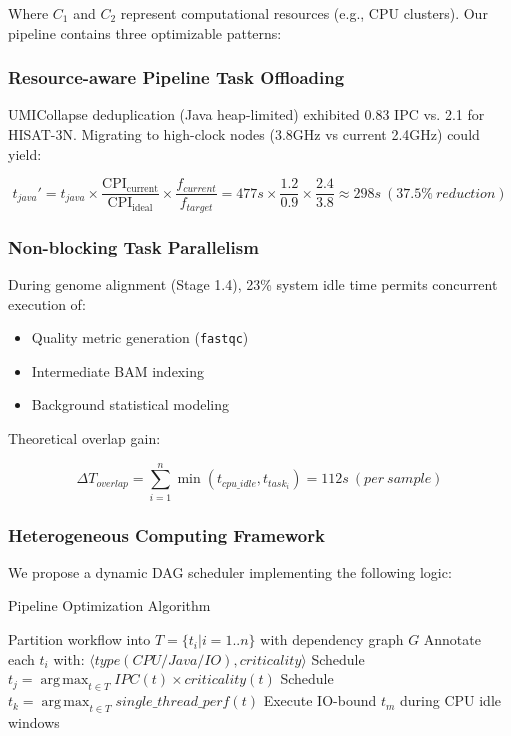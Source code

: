 \documentclass[a4paper,12pt]{article}
\DeclareMathOperator*{\argmax}{arg\,max}  %
\begin{document}
Where \(C_1\) and \(C_2\) represent computational resources (e.g., CPU clusters). Our pipeline contains three optimizable patterns:

\subsubsection{Resource-aware Pipeline Task Offloading}
UMICollapse deduplication (Java heap-limited) exhibited 0.83 IPC vs. 2.1 for HISAT-3N. Migrating to high-clock nodes (3.8GHz vs current 2.4GHz) could yield:

\begin{equation}
t_{java}' = t_{java} \times \frac{\mathrm{CPI_{current}}}{\mathrm{CPI_{ideal}}} \times \frac{f_{current}}{f_{target}} = 477s \times \frac{1.2}{0.9} \times \frac{2.4}{3.8} \approx 298s\ (37.5\%\ reduction)
\end{equation}

\subsubsection{Non-blocking Task Parallelism}
During genome alignment (Stage 1.4), 23\% system idle time permits concurrent execution of:
\begin{itemize}
    \item Quality metric generation (\texttt{fastqc})
    \item Intermediate BAM indexing
    \item Background statistical modeling
\end{itemize}

Theoretical overlap gain:

\begin{equation}
\Delta T_{overlap} = \sum_{i=1}^n \min(t_{cpu\_idle}, t_{task_i}) = 112s\ (per\ sample)
\end{equation}

\subsubsection{Heterogeneous Computing Framework}
We propose a dynamic DAG scheduler implementing the following logic:

\begin{algorithm}[H]
\caption{Pipeline Optimization Algorithm}
\begin{algorithmic}[1]
\State Partition workflow into \(T = \{t_i|i=1..n\}\) with dependency graph \(G\)
\State Annotate each \(t_i\) with: \(\langle \mathit{type}(CPU/Java/IO), \mathit{criticality} \rangle\)
        \State Schedule \(t_j = \argmax_{t \in T} \mathit{IPC}(t) \times \mathit{criticality}(t)\)
        \State Schedule \(t_k = \argmax_{t \in T} \mathit{single\_thread\_perf}(t)\)
    \EndIf
    \State Execute IO-bound \(t_m\) during CPU idle windows
\EndWhile
\end{algorithmic}
\end{algorithm}
\end{document}
